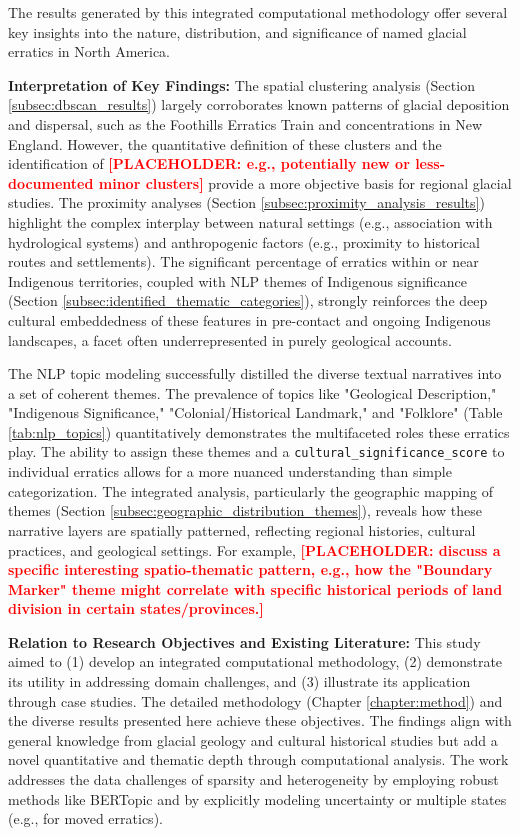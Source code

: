 \documentclass[
11pt, %
english, %
singlespacing, %
headsepline, %
]{MastersDoctoralThesis} %
\newcommand{\placeholdertext}[1]{\textcolor{red}{\textbf{[PLACEHOLDER: #1]}}}
\begin{document}
The results generated by this integrated computational methodology offer several key insights into the nature, distribution, and significance of named glacial erratics in North America.

\textbf{Interpretation of Key Findings:}
The spatial clustering analysis (Section \ref{subsec:dbscan_results}) largely corroborates known patterns of glacial deposition and dispersal, such as the Foothills Erratics Train and concentrations in New England. However, the quantitative definition of these clusters and the identification of \placeholdertext{e.g., potentially new or less-documented minor clusters} provide a more objective basis for regional glacial studies. The proximity analyses (Section \ref{subsec:proximity_analysis_results}) highlight the complex interplay between natural settings (e.g., association with hydrological systems) and anthropogenic factors (e.g., proximity to historical routes and settlements). The significant percentage of erratics within or near Indigenous territories, coupled with NLP themes of Indigenous significance (Section \ref{subsec:identified_thematic_categories}), strongly reinforces the deep cultural embeddedness of these features in pre-contact and ongoing Indigenous landscapes, a facet often underrepresented in purely geological accounts.

The NLP topic modeling successfully distilled the diverse textual narratives into a set of coherent themes. The prevalence of topics like "Geological Description," "Indigenous Significance," "Colonial/Historical Landmark," and "Folklore" (Table \ref{tab:nlp_topics}) quantitatively demonstrates the multifaceted roles these erratics play. The ability to assign these themes and a \texttt{cultural\_significance\_score} to individual erratics allows for a more nuanced understanding than simple categorization. The integrated analysis, particularly the geographic mapping of themes (Section \ref{subsec:geographic_distribution_themes}), reveals how these narrative layers are spatially patterned, reflecting regional histories, cultural practices, and geological settings. For example, \placeholdertext{discuss a specific interesting spatio-thematic pattern, e.g., how the "Boundary Marker" theme might correlate with specific historical periods of land division in certain states/provinces.}

\textbf{Relation to Research Objectives and Existing Literature:}
This study aimed to (1) develop an integrated computational methodology, (2) demonstrate its utility in addressing domain challenges, and (3) illustrate its application through case studies. The detailed methodology (Chapter \ref{chapter:method}) and the diverse results presented here achieve these objectives. The findings align with general knowledge from glacial geology \cite{Flint1971, Benn2010} and cultural historical studies \cite{Seelye1997, Lenik2009} but add a novel quantitative and thematic depth through computational analysis. The work addresses the data challenges of sparsity and heterogeneity \cite{Gregory2013} by employing robust methods like BERTopic and by explicitly modeling uncertainty or multiple states (e.g., for moved erratics).
\end{document}
